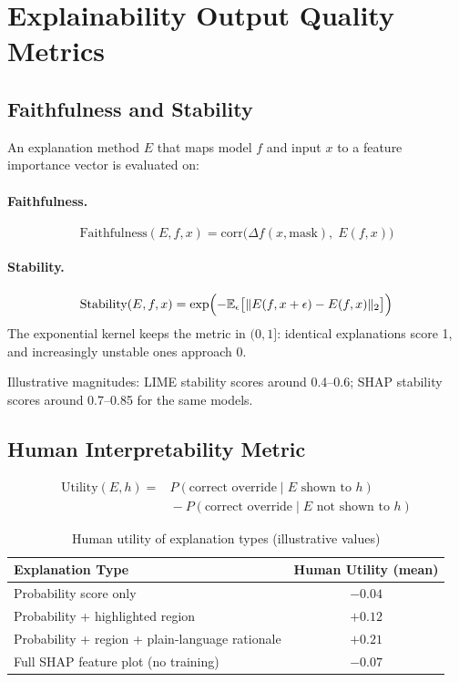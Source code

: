 \section{Explainability Output Quality Metrics}

\subsection{Faithfulness and Stability}

An explanation method $E$ that maps model $f$ and input $x$ to a feature importance vector is evaluated on:

\paragraph{Faithfulness.}
\[
\text{Faithfulness}(E, f, x) = \text{corr}\bigl(\Delta f(x, \text{mask}),\; E(f, x)\bigr)
\]

\paragraph{Stability.}
\[
\text{Stability}(E, f, x) = \exp\Bigl(-\mathbb{E}_{\epsilon}\bigl[\|E(f, x + \epsilon) - E(f, x)\|_2\bigr]\Bigr)
\]
The exponential kernel keeps the metric in $(0, 1]$: identical explanations score 1, and increasingly unstable ones approach 0.

Illustrative magnitudes: LIME stability scores around 0.4--0.6; SHAP stability scores around 0.7--0.85 for the same models.

\subsection{Human Interpretability Metric}

\[
\begin{aligned}
\text{Utility}(E, h) = {} & P(\text{correct override} \mid E \text{ shown to } h) \\
  & {} - P(\text{correct override} \mid E \text{ not shown to } h)
\end{aligned}
\]

\begin{table}[htbp]
\caption{Human utility of explanation types (illustrative values)}
\label{tab:explanation-utility}
\centering
\small
\begin{tabular}{@{}lc@{}}
\toprule
\textbf{Explanation Type} & \textbf{Human Utility (mean)} \\
\midrule
Probability score only & $-0.04$ \\
Probability + highlighted region & $+0.12$ \\
Probability + region + plain-language rationale & $+0.21$ \\
Full SHAP feature plot (no training) & $-0.07$ \\
\bottomrule
\end{tabular}
\end{table}

